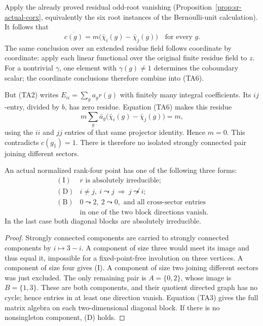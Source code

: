 Apply the already proved residual odd-root vanishing
(Proposition~\ref{prop:sr-actual-corx}, equivalently
the six root instances of the Bernoulli-unit calculation).
It follows that
\[
 \overline{c(g)}
           =m\bigl(\bar\chi_i(g)-\bar\chi_j(g)\bigr)
                         \quad\text{for every }g.         \tag{TA6}
\]
The same conclusion over an extended residue field follows
coordinate by coordinate: apply each linear functional over
the original finite residue field to \(z\).
For a nontrivial \(\gamma\), one element with
\(\gamma(g)\ne1\) determines the coboundary scalar; the
coordinate conclusions therefore combine into (TA6).

But (TA2) writes \(E_{ii}=\sum_g a_g r(g)\) with finitely many
integral coefficients. Its \(ij\)-entry, divided by \(b\),
has zero residue. Equation (TA6) makes this residue
\[
 m\sum_g\bar a_g
            \bigl(\bar\chi_i(g)-\bar\chi_j(g)\bigr)=m,
\]
using the \(ii\) and \(jj\) entries of that same projector
identity. Hence \(m=0\).
This contradicts \(c(g_1)=1\).
There is therefore no isolated strongly connected pair
joining different sectors.

\begin{srlemma}\label{lem:sr-four-actual-triangular-alternatives}
An actual normalized rank-four point has one of the following
three forms:
\[
 \begin{array}{ll}
 \mathrm{(I)}&r\text{ is absolutely irreducible};\\
 \mathrm{(D)}&
  i\ne j,\ i\leadsto j\ \Longrightarrow\ j\not\leadsto i;\\
 \mathrm{(B)}&
 0\leadsto2,\ 2\leadsto0,\text{ and all cross-sector entries}\\
 &\text{in one of the two block directions vanish}.
 \end{array}
\]
In the last case both diagonal blocks are absolutely
irreducible.
\end{srlemma}
\begin{proof}
Strongly connected components are carried to strongly connected
components by \(i\mapsto3-i\).
A component of size three would meet its image and thus equal
it, impossible for a fixed-point-free involution on three
vertices. A component of size four gives (I).
A component of size two joining different sectors was just
excluded. The only remaining pair is \(A=\{0,2\}\), whose
image is \(B=\{1,3\}\).
These are both components, and their quotient directed graph
has no cycle; hence entries in at least one direction vanish.
Equation (TA3) gives the full matrix algebra on each
two-dimensional diagonal block.
If there is no nonsingleton component, (D) holds.
\end{proof}

